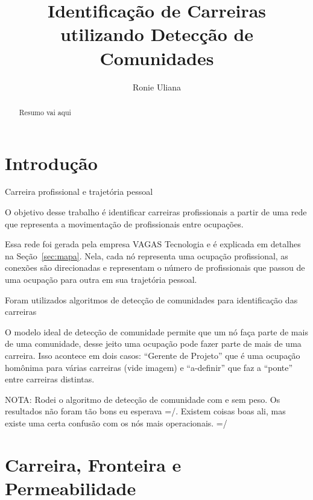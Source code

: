 \documentclass[
  article,
  11pt,
  a4paper,
  english,
  brazil,
  sumario=tradicional]{abntex2}
\title{Identificação de Carreiras utilizando Detecção de Comunidades}
\author{Ronie Uliana}
\begin{document}

\frenchspacing

\maketitle

\begin{abstract}
Resumo vai aqui
\end{abstract}

\section{Introdução}

Carreira profissional e trajetória pessoal

O objetivo desse trabalho é identificar carreiras profissionais a partir de uma rede que representa a movimentação de profissionais entre ocupações.

Essa rede foi gerada pela empresa VAGAS Tecnologia e é explicada em detalhes na Seção~\ref{sec:mapa}. Nela, cada nó representa uma ocupação profissional, as conexões são direcionadas e representam o número de profissionais que passou de uma ocupação para outra em sua trajetória pessoal.



Foram utilizados algoritmos de detecção de comunidades para identificação das carreiras

O modelo ideal de detecção de comunidade permite que um nó faça parte de mais de uma comunidade, desse jeito uma ocupação pode fazer parte de mais de uma carreira. Isso acontece em dois casos: \enquote{Gerente de Projeto} que é uma ocupação homônima para várias carreiras (vide imagem) e \enquote{a-definir} que faz a \enquote{ponte} entre carreiras distintas.

NOTA: Rodei o algoritmo de detecção de comunidade com e sem peso. Os resultados não foram tão bons eu esperava =/. Existem coisas boas ali, mas existe uma certa confusão com os nós mais operacionais. =/

\section{Carreira, Fronteira e Permeabilidade} \label{sec:carreira}
\end{document}
